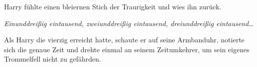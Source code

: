 Harry fühlte einen bleiernen Stich der Traurigkeit und wies ihn zurück.

\emph{Einunddreißig eintausend, zweiunddreißig eintausend, dreiunddreißig eintausend…}

Als Harry die vierzig erreicht hatte, schaute er auf seine Armbanduhr, notierte sich die genaue Zeit und drehte einmal an seinem Zeitumkehrer, um sein eigenes Trommelfell nicht zu gefährden.

